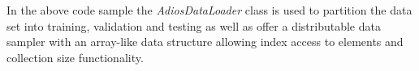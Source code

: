 



In the above code sample the {\it AdiosDataLoader} class is used to partition the data set into training, validation and testing as well as offer a distributable data sampler with an array-like data structure allowing index access to elements and collection size functionality.

